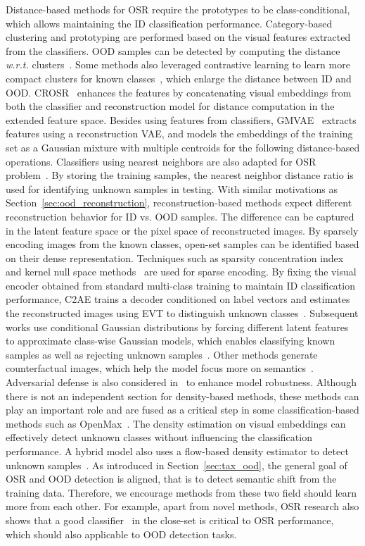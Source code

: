 \smallskip
{}
\label{sec:osr_distance}
Distance-based methods for OSR require the prototypes to be class-conditional, which allows maintaining the ID classification performance.
Category-based clustering and prototyping are performed based on the visual features extracted from the classifiers. OOD samples can be detected by computing the distance \emph{w.r.t.} clusters~.
Some methods also leveraged contrastive learning to learn more compact clusters for known classes~, which enlarge the distance between ID and OOD.
CROSR~ enhances the features by concatenating visual embeddings from both the classifier and reconstruction model for distance computation in the extended feature space.
Besides using features from classifiers, GMVAE~ extracts features using a reconstruction VAE, and models the embeddings of the training set as a Gaussian mixture with multiple centroids for the following distance-based operations.
Classifiers using nearest neighbors are also adapted for OSR problem~. By storing the training samples, the nearest neighbor distance ratio is used for identifying unknown samples in testing.
\smallskip
{}
\label{sec:osr_reconstruction}
With similar motivations as Section~\ref{sec:ood_reconstruction},
reconstruction-based methods expect different reconstruction behavior for ID vs. OOD samples. The difference can be captured in the latent feature space or the pixel space of reconstructed images. 
By sparsely encoding images from the known classes, open-set samples can be identified based on their dense representation. Techniques such as sparsity concentration index~ and kernel null space methods~ are used for sparse encoding.
By fixing the visual encoder obtained from standard multi-class training to maintain ID classification performance, C2AE trains a decoder conditioned on label vectors and estimates the reconstructed images using EVT to distinguish unknown classes~.
Subsequent works use conditional Gaussian distributions by forcing different latent features to approximate class-wise Gaussian models, which enables classifying known samples as well as rejecting unknown samples~.
Other methods generate counterfactual images, which help the model focus more on semantics~.
Adversarial defense is also considered in~ to enhance model robustness.
\smallskip
{}
\label{sec:osr_hybrid}
Although there is not an independent section for density-based methods, these methods can play an important role and are fused as a critical step in some classification-based methods such as OpenMax~. The density estimation on visual embeddings can effectively detect unknown classes without influencing the classification performance. A hybrid model also uses a flow-based density estimator to detect unknown samples~.
As introduced in Section~\ref{sec:tax_ood}, the general goal of OSR and OOD detection is aligned, that is to detect semantic shift from the training data. Therefore, we encourage methods from these two field should learn more from each other.
For example, apart from novel methods, OSR research also shows that a good classifier~ in the close-set is critical to OSR performance, which should also applicable to OOD detection tasks.

